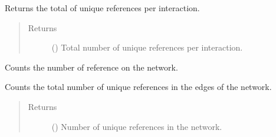 \documentclass[letterpaper,10pt,english]{sphinxmanual}
\begin{document}
\begin{fulllineitems}

\begin{fulllineitems}
\label{\detokenize{main:pypath.main.PyPath.numof_reference_interaction_pairs}}
Returns the total of unique references per interaction.
\begin{quote}\begin{description}
\item[{Returns}] \leavevmode
() \textendash{} Total number of unique references per
interaction.

\end{description}\end{quote}

\end{fulllineitems}


\begin{fulllineitems}
\label{\detokenize{main:pypath.main.PyPath.numof_references}}
Counts the number of reference on the network.

Counts the total number of unique references in the edges of the
network.
\begin{quote}\begin{description}
\item[{Returns}] \leavevmode
() \textendash{} Number of unique references in the network.

\end{description}\end{quote}

\end{fulllineitems}


\begin{fulllineitems}
\label{\detokenize{main:pypath.main.PyPath.numof_undirected_edges}}
\end{fulllineitems}



\end{fulllineitems}
\end{document}
